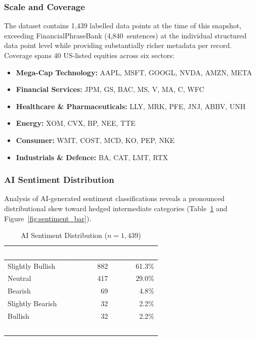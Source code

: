 \documentclass[11pt,a4paper]{article}
\begin{document}
\subsubsection{Scale and Coverage}

The dataset contains 1,439 labelled data points at the time of this snapshot,
exceeding FinancialPhraseBank (4,840~sentences) at the individual structured data
point level while providing substantially richer metadata per record. Coverage spans
40 US-listed equities across six sectors:

\begin{itemize}[leftmargin=1.8em, itemsep=2pt]
  \item \textbf{Mega-Cap Technology:} AAPL, MSFT, GOOGL, NVDA, AMZN, META
  \item \textbf{Financial Services:} JPM, GS, BAC, MS, V, MA, C, WFC
  \item \textbf{Healthcare \& Pharmaceuticals:} LLY, MRK, PFE, JNJ, ABBV, UNH
  \item \textbf{Energy:} XOM, CVX, BP, NEE, TTE
  \item \textbf{Consumer:} WMT, COST, MCD, KO, PEP, NKE
  \item \textbf{Industrials \& Defence:} BA, CAT, LMT, RTX
\end{itemize}

\subsubsection{AI Sentiment Distribution}

Analysis of AI-generated sentiment classifications reveals a pronounced distributional
skew toward hedged intermediate categories (Table~\ref{tab:sentiment_dist} and
Figure~\ref{fig:sentiment_bar}).

\begin{table}[H]
\centering
\caption{AI Sentiment Distribution ($n = 1{,}439$)}
\label{tab:sentiment_dist}
\renewcommand{\arraystretch}{1.3}
\begin{tabular}{lrr}
\toprule
\rowcolor{headerblue}
\textcolor{white}{\textbf{Sentiment Category}} &
\textcolor{white}{\textbf{Count}} &
\textcolor{white}{\textbf{Proportion}} \\
\midrule
Slightly Bullish  & 882 & 61.3\% \\
\rowcolor{rowgray}
Neutral           & 417 & 29.0\% \\
Bearish           &  69 &  4.8\% \\
\rowcolor{rowgray}
Slightly Bearish  &  32 &  2.2\% \\
Bullish           &  32 &  2.2\% \\
\midrule
\rowcolor{headerblue}
\textcolor{white}{\textbf{Total}} &
\textcolor{white}{\textbf{1,439}} &
\textcolor{white}{\textbf{100.0\%}} \\
\bottomrule
\end{tabular}
\end{table}
\end{document}
